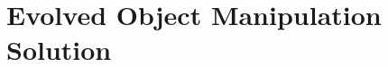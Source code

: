 \chapter{Evolved Object Manipulation Solution}
\label{app:ManipulationSolution}
\singlespacing

\begin{multicols}{2}
  \tiny
  
\end{multicols}

\doublespacing
